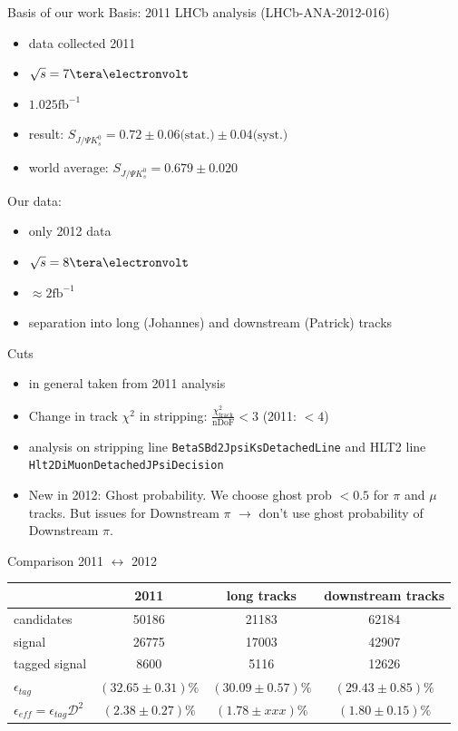 \documentclass{beamer}
\newcommand{\SJPsi}{S_{J/\Psi K_s^0}}
\begin{document}
	\begin{frame}{Basis of our work}
	Basis: 2011 LHCb analysis (LHCb-ANA-2012-016)
	\begin{itemize}
	    \item data collected 2011
	    \item $\sqrt{s} = 7\tera\electronvolt$
	    \item $1.025 \mathrm{fb}^{-1}$
	    \item result: $\SJPsi = 0.72 \pm 0.06 \text{(stat.)} \pm 0.04 \text{(syst.)}$
	    \item world average: $\SJPsi = 0.679 \pm 0.020$
	\end{itemize}
	
	Our data:
	\begin{itemize}
	    \item only 2012 data
	    \item $\sqrt{s} = 8\tera\electronvolt$
	    \item $\approx 2 \mathrm{fb}^{-1}$
   	    \item separation into long (Johannes) and downstream (Patrick) tracks
	\end{itemize}
	\end{frame}

	
	\begin{frame}{Cuts}
    \begin{itemize}
    \item in general taken from 2011 analysis
    \item Change in track $\chi^2$ in stripping: $\frac{\chi^2_{\text{track}}}{\text{nDoF}} < 3$ (2011: $<4$)
    \item analysis on stripping line \texttt{BetaSBd2JpsiKsDetachedLine} and HLT2 line \texttt{Hlt2DiMuonDetachedJPsiDecision}
	\item New in 2012: Ghost probability. We choose ghost prob $<0.5$ for $\pi$ and $\mu$ tracks. But issues for Downstream $\pi$ $\rightarrow$ don't use ghost probability of Downstream $\pi$.
	\end{itemize}
	\end{frame}
	
	\begin{frame}{Comparison 2011 $\leftrightarrow$ 2012}
	\begin{tabular}{l c c c}
	\hline \hline 
	 & 2011 & long tracks & downstream tracks \\ \hline
	 candidates & 50186 & 21183 & 62184 \\
	 signal & 26775 & 17003 & 42907 \\
	 tagged signal & 8600 & 5116 & 12626 \\ 
	 $\epsilon_{tag}$ & $(32.65 \pm 0.31)\%$ &$(30.09\pm 0.57)\%$ & $(29.43\pm 0.85)\%$ \\
	 $\epsilon_{eff}= \epsilon_{tag}\mathcal{D}^2$ & $(2.38 \pm 0.27)\%$ & $(1.78 \pm xxx)\%$ & $(1.80\pm 0.15)\%$ \\ \hline
	\end{tabular}
	\end{frame}
	
\end{document}
